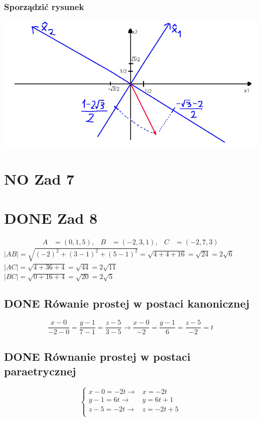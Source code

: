 \documentclass[11pt]{article}
\begin{document}
\subsubsection{Sporządzić rysunek}
\label{sec:orgbe73bae}
\begin{center}
\includegraphics[width=.9\linewidth]{img/zad6.jpg}
\end{center}
\section{{\bfseries\sffamily NO} Zad 7}
\label{sec:org4f74247}
\section{{\bfseries\sffamily DONE} Zad 8}
\label{sec:orged15095}
\begin{align*}
A&=(0,1,5),& B&=(-2,3,1),& C&=(-2, 7,3)
\end{align*}
\(|AB| = \sqrt{(-2)^{2} + (3-1)^{2} + (5 -1)^{2}} = \sqrt{4 + 4 +16} = \sqrt{24} = 2\sqrt{6}\)
\\\empty
\(|AC| = \sqrt{ 4 + 36 + 4} = \sqrt{44} = 2 \sqrt{11}\)
\\\empty
\(|BC| = \sqrt{0 + 16 + 4} = \sqrt{20} = 2\sqrt{5}\)
\subsection{{\bfseries\sffamily DONE} Rówanie prostej w postaci kanonicznej}
\label{sec:orgfde4f41}
$$\frac{x - 0}{-2 - 0} = \frac{y - 1}{7 - 1} = \frac{z - 5}{3 -5}
\to \frac{x - 0}{-2} = \frac{y - 1}{6} = \frac{z - 5}{-2}
= t$$
\subsection{{\bfseries\sffamily DONE} Równanie prostej w postaci paraetrycznej}
\label{sec:org5580254}
\[\begin{cases}
x-0 = -2t \to & x = -2t\\
y - 1 = 6t \to & y = 6t +1\\
z -5 = -2t \to & z = -2t + 5\\
\end{cases}\]
\end{document}
